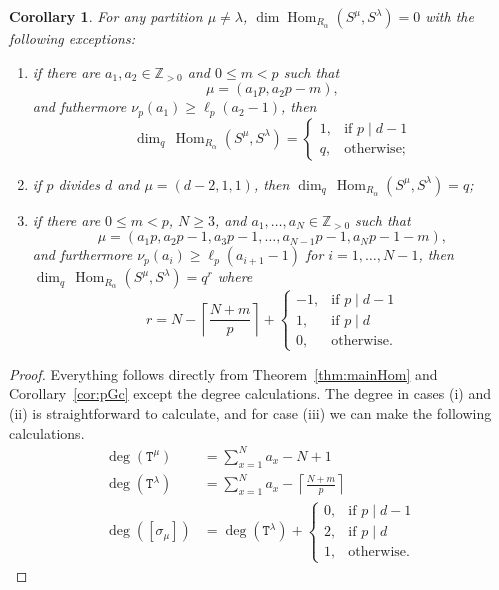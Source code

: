 \documentclass[twoside,11pt,reqno,letter]{amsart}
\numberwithin{equation}{section}
\newtheorem{Corollary}[equation]{Corollary}
\theoremstyle{definition}  %
\newcommand{\Hom}{\operatorname{Hom}}
\def\qdim{{\operatorname{dim}_q}\,}
\newcommand{\Z}{\mathbb{Z}}
\newcommand{\0}{{\bar 0}}
\newcommand{\1}{{\bar 1}}
\newcommand{\la}{\lambda}
\newcommand{\al}{\alpha}
\newcommand{\si}{\sigma}
\def\T{{\mathtt T}}
\begin{document}
{\begin{Corollary}
For any partition $\mu \neq \la$, $\dim \Hom_{R_\al}(S^\mu, S^\la) = 0$ with the following exceptions:
\begin{enumerate}
  \item if there are $a_1, a_2 \in \Z_{>0}$ and $0 \leq m < p$ such that
    $$\mu = (a_1 p, a_2 p - m),$$
  and futhermore $\nu_p(a_1) \geq \ell_p(a_2-1)$, then
    $$\qdim \Hom_{R_\al}(S^\mu, S^\la) = \begin{cases} 1, &\text{if } p \mid d-1\\
        q, &\text{otherwise;} \end{cases}$$
  \item if $p$ divides $d$ and $\mu = (d-2, 1, 1)$, then $\qdim \Hom_{R_\al}(S^\mu, S^\la) = q$;
  \item if there are $0 \leq m < p$, $N \geq 3$, and $a_1, \dots, a_N \in \Z_{>0}$ such that
    $$\mu = (a_1p, a_2p-1, a_3p-1, \dots, a_{N-1}p-1,a_Np-1-m),$$
  and furthermore $\nu_p(a_i) \geq \ell_p(a_{i+1}-1)$ for $i = 1,\dots,N-1$, then
  $\qdim \Hom_{R_\al}(S^\mu, S^\la) = q^r$ where
  $$r = N-\left\lceil \frac{N+m}{p} \right\rceil + \begin{cases} -1, &\text{if } p \mid d-1\\
        1, &\text{if } p \mid d\\
        0, &\text{otherwise.} \end{cases}$$
\end{enumerate}
\end{Corollary}

\begin{proof}
Everything follows directly from Theorem~\ref{thm:mainHom} and Corollary~\ref{cor:pGc} except the degree calculations. The degree in cases (i) and (ii) is straightforward to calculate, and for case (iii) we can make the following calculations. 
\begin{align*}
\deg(\T^\mu) &= \sum_{x=1}^N a_x - N + 1 \\
\deg(\T^\la) &= \sum_{x=1}^N a_x - \left\lceil \frac{N+m}{p} \right\rceil \\
\deg([\si_\mu]) &= \deg(\T^\la) + \begin{cases} 0, &\text{if } p \mid d-1\\
        2, &\text{if } p \mid d\\
        1, &\text{otherwise.} \end{cases}
\end{align*}
\end{proof}











}
\end{document}
